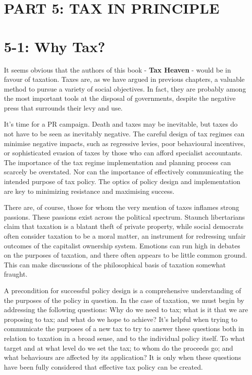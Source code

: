 \documentclass[]{tufte-handout}
\begin{document}
\newpage

\hypertarget{part-5-tax-in-principle}{%
\section{PART 5: TAX IN PRINCIPLE}\label{part-5-tax-in-principle}}

\hypertarget{why-tax}{%
\section{5-1: Why Tax?}\label{why-tax}}

It seems obvious that the authors of this book - \textbf{Tax Heaven} -
would be in favour of taxation. Taxes are, as we have argued in previous
chapters, a valuable method to pursue a variety of social objectives. In
fact, they are probably among the most important tools at the disposal
of governments, despite the negative press that surrounds their levy and
use.

It's time for a PR campaign. Death and taxes may be inevitable, but
taxes do not have to be seen as inevitably negative. The careful design
of tax regimes can minimise negative impacts, such as regressive levies,
poor behavioural incentives, or sophisticated evasion of taxes by those
who can afford specialist accountants. The importance of the tax regime
implementation and planning process can scarcely be overstated. Nor can
the importance of effectively communicating the intended purpose of tax
policy. The optics of policy design and implementation are key to
minimizing resistance and maximising success.

There are, of course, those for whom the very mention of taxes inflames
strong passions. These passions exist across the political spectrum.
Staunch libertarians claim that taxation is a blatant theft of private
property, while social democrats often consider taxation to be a moral
matter, an instrument for redressing unfair outcomes of the capitalist
ownership system. Emotions can run high in debates on the purposes of
taxation, and there often appears to be little common ground. This can
make discussions of the philosophical basis of taxation somewhat
fraught.

A precondition for successful policy design is a comprehensive
understanding of the purposes of the policy in question. In the case of
taxation, we must begin by addressing the following questions: Why do we
need to tax; what is it that we are proposing to tax; and what do we
hope to achieve? It's helpful when trying to communicate the purposes of
a new tax to try to answer these questions both in relation to taxation
in a broad sense, and to the individual policy itself. To what target
and at what level do we set the tax; to whom do the proceeds go; and
what behaviours are affected by its application? It is only when these
questions have been fully considered that effective tax policy can be
created.
\end{document}
